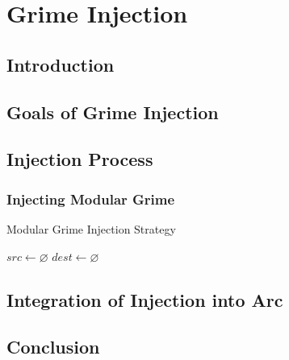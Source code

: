 \chapter{Grime Injection}

\section{Introduction}

\section{Goals of Grime Injection}

\section{Injection Process}

\subsection{Injecting Modular Grime}

\begin{algorithm}
 \caption{Modular Grime Injection Strategy}
 
 \begin{algorithmic}[1]
 \Statex
 \State $src \gets \varnothing$
 \State $dest \gets \varnothing$
 \Else
 \EndIf
 \Else
 \EndIf
 \Else
 \EndIf
 \end{algorithmic}
 
\end{algorithm}

\section{Integration of Injection into Arc}

\section{Conclusion}